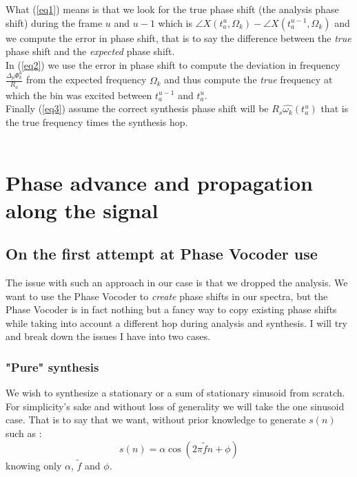 \documentclass[]{article}
\begin{document}
What (\ref{eq1}) means is that we look for the true phase shift (the analysis phase shift) during the frame $u$ and $u-1$ which is $\angle X(t_a^u, \Omega_k) - \angle X(t_a^{u-1}, \Omega_k)$ and we compute the error in phase shift, that is to say the difference between the \emph{true} phase shift and the \emph{expected} phase shift.\\
In (\ref{eq2}) we use the error in phase shift to compute the deviation in frequency $\frac{\Delta_p \Phi_{k}^u}{R_a}$ from the expected frequency $\Omega_k$ and thus compute the \emph{true} frequency at which the bin was excited between $t_a^{u-1}$ and $t_a^{u}$.\\
Finally (\ref{eq3}) assume the correct synthesis phase shift will be $R_s\hat{\omega_k}(t_a^u)$ that is the true frequency times the synthesis hop.\\
\\

\section{Phase advance and propagation along the signal}\label{phase-advance}
\subsection{On the first attempt at Phase Vocoder use}

The issue with such an approach in our case is that we dropped the analysis. We want to use the Phase Vocoder to \emph{create} phase shifts in our spectra, but the Phase Vocoder is in fact nothing but a fancy way to copy existing phase shifts while taking into account a different hop during analysis and synthesis. I will try and break down the issues I have into two cases.


\subsubsection{"Pure" synthesis}\label{puresynth}
We wish to synthesize a stationary or a sum of stationary sinusoid from scratch. For simplicity's sake and without loss of generality we will take the one sinusoid case.
That is to say that we want, without prior knowledge to generate $s(n)$ such as :
\begin{equation}\label{statSignal}
s(n) = \alpha \cos(2\pi\tilde{f} n + \phi)
\end{equation}
knowing only $\alpha$, $\tilde{f}$ and $\phi$.\\
\end{document}

